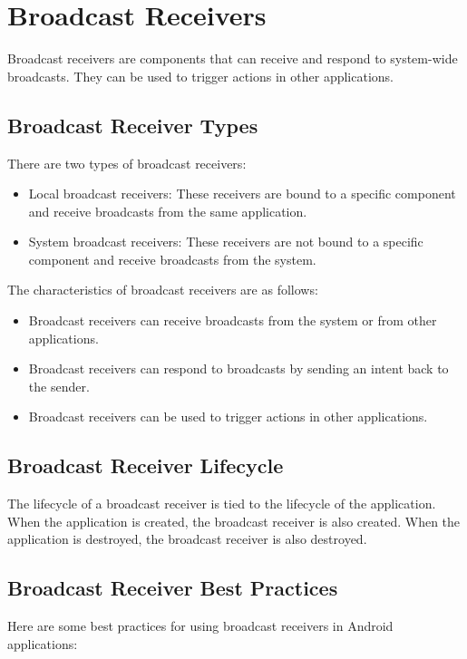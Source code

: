 \documentclass{article}
\begin{document}
\section{Broadcast Receivers}
Broadcast receivers are components that can receive and respond to system-wide broadcasts. They can be used to trigger actions in other applications.

\subsection{Broadcast Receiver Types}
There are two types of broadcast receivers:

\begin{itemize}
\item Local broadcast receivers: These receivers are bound to a specific component and receive broadcasts from the same application.
\item System broadcast receivers: These receivers are not bound to a specific component and receive broadcasts from the system.
\end{itemize}

The characteristics of broadcast receivers are as follows:

\begin{itemize}
\item Broadcast receivers can receive broadcasts from the system or from other applications.
\item Broadcast receivers can respond to broadcasts by sending an intent back to the sender.
\item Broadcast receivers can be used to trigger actions in other applications.
\end{itemize}

\subsection{Broadcast Receiver Lifecycle}
The lifecycle of a broadcast receiver is tied to the lifecycle of the application. When the application is created, the broadcast receiver is also created. When the application is destroyed, the broadcast receiver is also destroyed.

\subsection{Broadcast Receiver Best Practices}
Here are some best practices for using broadcast receivers in Android applications:
\end{document}
